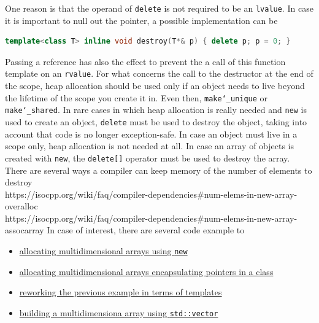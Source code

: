 One reason is that the operand of \texttt{delete} is not required to be 
an \texttt{lvalue}.
\newline
In case it is important to null out the pointer, a possible implementation 
can be
\begin{lstlisting}[language=C++]
template<class T> inline void destroy(T*& p) { delete p; p = 0; }
\end{lstlisting}
Passing a reference has also the effect to prevent the a call of this 
function template on an \texttt{rvalue}.
\newline
For what concerns the call to the destructor at the end of the scope, 
heap allocation should be used only if an object needs to live beyond the 
lifetime of the scope you create it in. Even then, \texttt{make\char`_unique} 
or \texttt{make\char`_shared}. In rare cases in which heap allocation is 
really needed and \texttt{new} is used to create an object, \texttt{delete} 
must be used to destroy the object, taking into account that code is 
no longer exception-safe.
\newline
In case an object must live in a scope only, heap allocation is not 
needed at all.
\newline
In case an array of objects is created with \texttt{new}, the \texttt{delete[]}
operator must be used to destroy the array. There are several ways a 
compiler can keep memory of the number of elements to destroy\\
https://isocpp.org/wiki/faq/compiler-dependencies\#num-elems-in-new-array-overalloc \\
https://isocpp.org/wiki/faq/compiler-dependencies\#num-elems-in-new-array-assocarray
\newline
In case of interest, there are several code example to
\begin{itemize}
    \item \href{https://isocpp.org/wiki/faq/freestore-mgmt#multidim-arrays}
               {allocating multidimensional arrays using \texttt{new}}
    
    \item \href{https://isocpp.org/wiki/faq/freestore-mgmt#multidim-arrays2}
               {allocating multidimensional arrays encapsulating pointers 
               in a class}
               
    \item \href{https://isocpp.org/wiki/faq/freestore-mgmt#multidim-arrays3}
               {reworking the previous example in terms of templates}
    
    \item \href{https://isocpp.org/wiki/faq/freestore-mgmt#multidim-arrays4}
               {building a multidimensiona array using \texttt{std::vector}}
    
\end{itemize}

